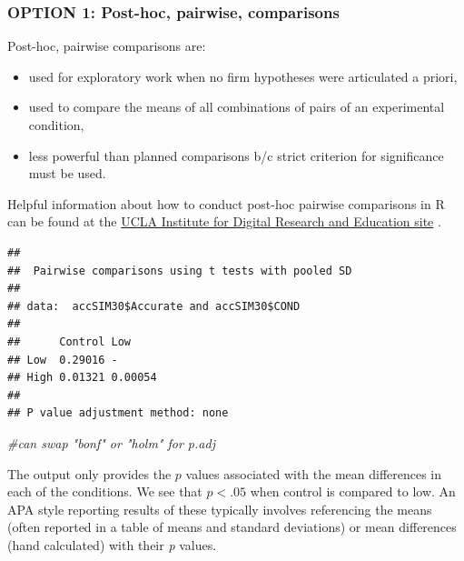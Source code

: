 \documentclass[
  english,
]{book}
\newenvironment{Shaded}{\begin{snugshade}}{\end{snugshade}}
\newcommand{\CommentTok}[1]{\textcolor[rgb]{0.56,0.35,0.01}{\textit{#1}}}
\newcommand{\DataTypeTok}[1]{\textcolor[rgb]{0.13,0.29,0.53}{#1}}
\newcommand{\KeywordTok}[1]{\textcolor[rgb]{0.13,0.29,0.53}{\textbf{#1}}}
\newcommand{\NormalTok}[1]{#1}
\newcommand{\OperatorTok}[1]{\textcolor[rgb]{0.81,0.36,0.00}{\textbf{#1}}}
\newcommand{\StringTok}[1]{\textcolor[rgb]{0.31,0.60,0.02}{#1}}
\providecommand{\tightlist}{%
  \setlength{\itemsep}{0pt}\setlength{\parskip}{0pt}}
\begin{document}
\hypertarget{option-1-post-hoc-pairwise-comparisons}{%
\subsubsection{OPTION 1: Post-hoc, pairwise, comparisons}\label{option-1-post-hoc-pairwise-comparisons}}

Post-hoc, pairwise comparisons are:

\begin{itemize}
\tightlist
\item
  used for exploratory work when no firm hypotheses were articulated a priori,
\item
  used to compare the means of all combinations of pairs of an experimental condition,
\item
  less powerful than planned comparisons b/c strict criterion for significance must be used.
\end{itemize}

Helpful information about how to conduct post-hoc pairwise comparisons in R can be found at the \href{https://stats.idre.ucla.edu/r/faq/how-can-i-do-post-hoc-pairwise-comparisons-in-r/}{UCLA Institute for Digital Research and Education site} \citep{noauthor_how_nodate}.

\begin{Shaded}
\end{Shaded}

\begin{verbatim}
## 
##  Pairwise comparisons using t tests with pooled SD 
## 
## data:  accSIM30$Accurate and accSIM30$COND 
## 
##      Control Low    
## Low  0.29016 -      
## High 0.01321 0.00054
## 
## P value adjustment method: none
\end{verbatim}

\begin{Shaded}
\begin{Highlighting}[]
\CommentTok{#can swap "bonf" or "holm" for p.adj}
\end{Highlighting}
\end{Shaded}

The output only provides the \(p\) values associated with the mean differences in each of the conditions. We see that \(p < .05\) when control is compared to low. An APA style reporting results of these typically involves referencing the means (often reported in a table of means and standard deviations) or mean differences (hand calculated) with their \emph{p} values.
\end{document}
